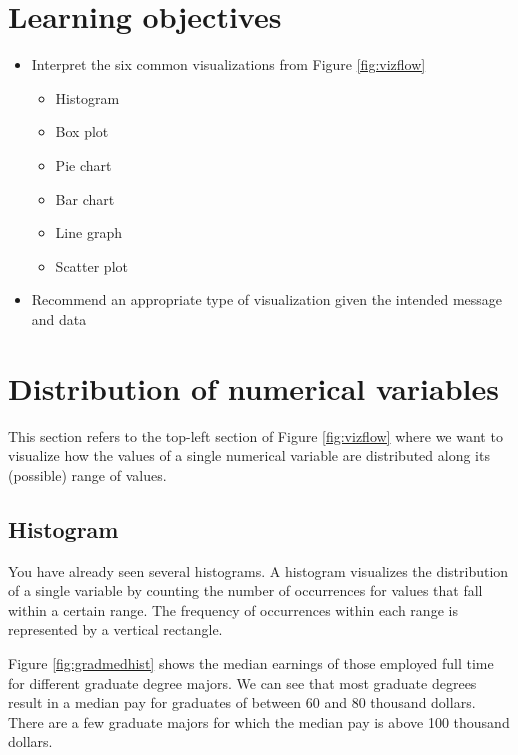 \documentclass[
]{book}
\providecommand{\tightlist}{%
  \setlength{\itemsep}{0pt}\setlength{\parskip}{0pt}}
\begin{document}
\hypertarget{lo5}{%
\section{Learning objectives}\label{lo5}}

\begin{itemize}
\tightlist
\item
  Interpret the six common visualizations from Figure \ref{fig:vizflow}

  \begin{itemize}
  \tightlist
  \item
    Histogram
  \item
    Box plot
  \item
    Pie chart
  \item
    Bar chart
  \item
    Line graph
  \item
    Scatter plot
  \end{itemize}
\item
  Recommend an appropriate type of visualization given the intended message and data
\end{itemize}

\hypertarget{distribution-of-numerical-variables}{%
\section{Distribution of numerical variables}\label{distribution-of-numerical-variables}}

This section refers to the top-left section of Figure \ref{fig:vizflow} where we want to visualize how the values of a single numerical variable are distributed along its (possible) range of values.

\hypertarget{histogram}{%
\subsection{Histogram}\label{histogram}}

You have already seen several histograms. A histogram visualizes the distribution of a single variable by counting the number of occurrences for values that fall within a certain range. The frequency of occurrences within each range is represented by a vertical rectangle.

Figure \ref{fig:gradmedhist} shows the median earnings of those employed full time for different graduate degree majors. We can see that most graduate degrees result in a median pay for graduates of between 60 and 80 thousand dollars. There are a few graduate majors for which the median pay is above 100 thousand dollars.
\end{document}
